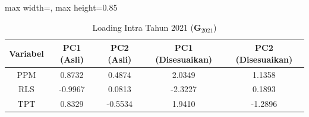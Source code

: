 \begin{table}[H]
\centering
\caption{Loading Intra Tahun 2021 ($\mathbf{G}_{2021}$)} \label{tab:sample1loading_intra_2021}
\begin{adjustbox}{max width=\textwidth, max height=0.85\textheight}
\begin{tabular}{|c|c|c|c|c|}
\hline
\textbf{Variabel} & \textbf{PC1 (Asli)} & \textbf{PC2 (Asli)} & \textbf{PC1 (Disesuaikan)} & \textbf{PC2 (Disesuaikan)} \\
\hline
PPM & 0.8732 & 0.4874 & 2.0349 & 1.1358 \\
RLS & -0.9967 & 0.0813 & -2.3227 & 0.1893 \\
TPT & 0.8329 & -0.5534 & 1.9410 & -1.2896 \\
\hline
\end{tabular}
\end{adjustbox}
\end{table}